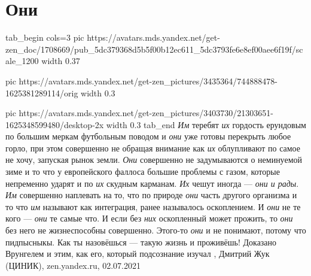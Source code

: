  
 
 
 
 
\chapter{Они}

\ifcmt
tab_begin cols=3
	pic https://avatars.mds.yandex.net/get-zen_doc/1708669/pub_5dc379368d5b5f00b12ec611_5dc3793fe6e8ef00aee6f19f/scale_1200
	width 0.37

	pic https://avatars.mds.yandex.net/get-zen_pictures/3435364/744888478-1625381289114/orig
	width 0.3

	pic https://avatars.mds.yandex.net/get-zen_pictures/3403730/21303651-1625348599480/desktop-2x
	width 0.3
tab_end
\fi
\emph{Им} теребят \emph{их} гордость ерундовым по большим меркам футбольным поводом и \emph{они} уже
готовы перекрыть любое горло, при этом совершенно не обращая внимание как \emph{их}
облупливают по самое не хочу, запуская рынок земли. \emph{Они} совершенно не
задумываются о неминуемой зиме и то что у европейского фаллоса большие проблемы
с газом, которые непременно ударят и по \emph{их} скудным карманам. \emph{Их} чешут иногда —
\emph{они и рады}. \emph{Им} совершенно наплевать на то, что по природе \emph{они} часть другого
организма и то что \emph{им} называют как интеграция, ранее называлось оскоплением. И
\emph{они} не те кого — \emph{они} те самые что. И если без \emph{них} оскопленный может прожить, то
\emph{они} без него не жизнеспособны совершенно. Этого-то \emph{они} и не понимают, потому
что пидпысныкы. Как ты назовёшься — такую жизнь и проживёшь! Доказано Врунгелем
и этим, как его, который подсознание изучал
, Дмитрий Жук (ЦИНИК), zen.yandex.ru, 02.07.2021


